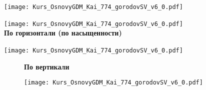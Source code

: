 \texttt{[image: Kurs\_OsnovyGDM\_Kai\_774\_gorodovSV\_v6\_0.pdf]}

\texttt{[image: Kurs\_OsnovyGDM\_Kai\_774\_gorodovSV\_v6\_0.pdf]}
\ \\

\textbf{По горизонтали (по насыщенности)}

\texttt{[image: Kurs\_OsnovyGDM\_Kai\_774\_gorodovSV\_v6\_0.pdf]}
\ \\

\begin{figure}[H]
\textbf{По вертикали}

\texttt{[image: Kurs\_OsnovyGDM\_Kai\_774\_gorodovSV\_v6\_0.pdf]}
\end{figure}

